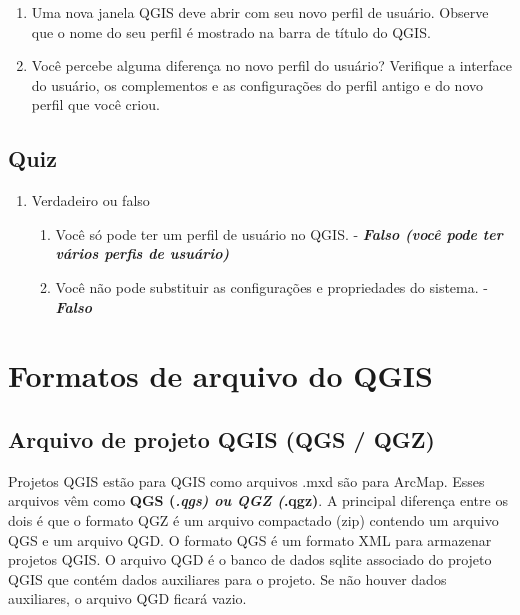 \documentclass[
]{krantz}
\providecommand{\tightlist}{%
  \setlength{\itemsep}{0pt}\setlength{\parskip}{0pt}}
\begin{document}
\begin{enumerate}
\def\labelenumi{\arabic{enumi}.}
\setcounter{enumi}{2}
\item
  Uma nova janela QGIS deve abrir com seu novo perfil de usuário. Observe que o nome do seu perfil é mostrado na barra de título do QGIS.
\item
  Você percebe alguma diferença no novo perfil do usuário? Verifique a interface do usuário, os complementos e as configurações do perfil antigo e do novo perfil que você criou.
\end{enumerate}

\hypertarget{quiz-5}{%
\subsection{Quiz}\label{quiz-5}}

\begin{enumerate}
\def\labelenumi{\arabic{enumi}.}
\tightlist
\item
  Verdadeiro ou falso

  \begin{enumerate}
  \def\labelenumii{\arabic{enumii}.}
  \tightlist
  \item
    Você só pode ter um perfil de usuário no QGIS. - \textbf{\emph{Falso (você pode ter vários perfis de usuário)}}
  \item
    Você não pode substituir as configurações e propriedades do sistema. - \textbf{\emph{Falso}}
  \end{enumerate}
\end{enumerate}

\hypertarget{formatos-de-arquivo-do-qgis}{%
\section{Formatos de arquivo do QGIS}\label{formatos-de-arquivo-do-qgis}}

\hypertarget{arquivo-de-projeto-qgis-qgs-qgz}{%
\subsection{Arquivo de projeto QGIS (QGS / QGZ)}\label{arquivo-de-projeto-qgis-qgs-qgz}}

Projetos QGIS estão para QGIS como arquivos .mxd são para ArcMap. Esses arquivos vêm como \textbf{QGS (\emph{.qgs)\textbf{ ou }QGZ (}.qgz)}. A principal diferença entre os dois é que o formato QGZ é um arquivo compactado (zip) contendo um arquivo QGS e um arquivo QGD. O formato QGS é um formato XML para armazenar projetos QGIS. O arquivo QGD é o banco de dados sqlite associado do projeto QGIS que contém dados auxiliares para o projeto. Se não houver dados auxiliares, o arquivo QGD ficará vazio.
\end{document}
